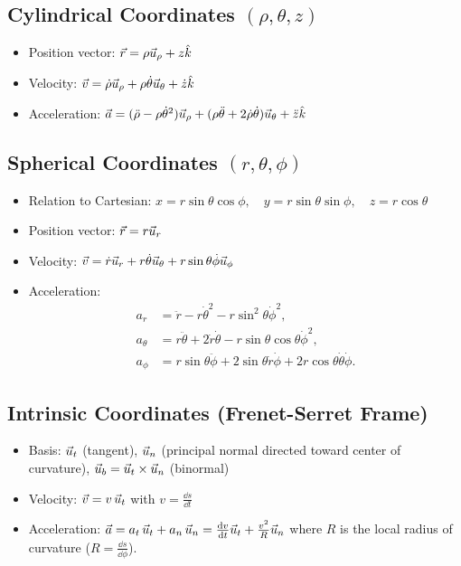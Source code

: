\subsection{Cylindrical Coordinates $(\rho, \theta, z)$}
\begin{itemize}[leftmargin=1.4em,itemsep=2pt]
  \item Position vector: $\vec{r} = \rho\vec{u}_\rho + z\hat{k}$
  \item Velocity: $\vec{v} = \dot{\rho}\vec{u}_\rho + \rho\dot{\theta}\vec{u}_\theta + \dot{z}\hat{k}$
  \item Acceleration: $\vec{a} = (\ddot{\rho} - \rho\dot{\theta}^2)\vec{u}_\rho + (\rho\ddot{\theta} + 2\dot{\rho}\dot{\theta})\vec{u}_\theta + \ddot{z}\hat{k}$
\end{itemize}

\subsection{Spherical Coordinates $(r, \theta, \phi)$}
\begin{itemize}[leftmargin=1.4em,itemsep=2pt]
  \item Relation to Cartesian: $x = r\sin\theta\cos\phi, \quad y = r\sin\theta\sin\phi, \quad z = r\cos\theta$
  \item Position vector: $\vec{r} = r\vec{u}_r$
  \item Velocity: $\vec{v} = \dot{r}\vec{u}_r + r\dot{\theta}\vec{u}_\theta + r\sin\theta\dot{\phi}\vec{u}_\phi$
  \item Acceleration:
  \begin{align*}
  a_r &= \ddot{r} - r\dot{\theta}^2 - r\sin^2\theta\dot{\phi}^2, \\
  a_\theta &= r\ddot{\theta} + 2\dot{r}\dot{\theta} - r\sin\theta\cos\theta\dot{\phi}^2, \\
  a_\phi &= r\sin\theta\ddot{\phi} + 2\sin\theta\dot{r}\dot{\phi} + 2r\cos\theta\dot{\theta}\dot{\phi}.
  \end{align*}
\end{itemize}

\subsection{Intrinsic Coordinates (Frenet-Serret Frame)}
\begin{itemize}[leftmargin=1.4em,itemsep=2pt]
  \item Basis: $\vec{u}_t$ (tangent), $\vec{u}_n$ (principal normal directed toward center of curvature), $\vec{u}_b = \vec{u}_t\times\vec{u}_n$ (binormal)
  \item Velocity: $\vec{v} = v\,\vec{u}_t$ with $v = \frac{\dd s}{\dd t}$
  \item Acceleration: $\vec{a} = a_t\,\vec{u}_t + a_n\,\vec{u}_n = \frac{\mathrm{d} v}{\mathrm{d} t}\vec{u}_t + \frac{v^2}{R}\vec{u}_n$
  where $R$ is the local radius of curvature ($R = \frac{\dd s}{\dd\phi}$).
\end{itemize}

